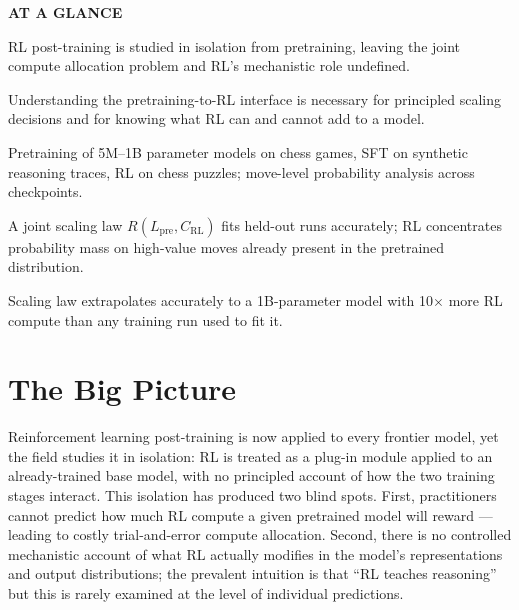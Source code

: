 \documentclass[10pt,twocolumn]{article}
\begin{document}
\begin{mdframed}[backgroundcolor=boxgray,linecolor=rulered,linewidth=1pt,
    innerleftmargin=6pt,innerrightmargin=6pt,
    innertopmargin=6pt,innerbottommargin=6pt]
\textbf{\small AT A GLANCE}\par\vspace{4pt}
\begin{description}[leftmargin=0pt,labelsep=4pt,itemsep=2pt,parsep=0pt,
    font=\small\bfseries]
  \item[Problem:] RL post-training is studied in isolation from pretraining,
    leaving the joint compute allocation problem and RL's mechanistic
    role undefined.
  \item[Why it matters:] Understanding the pretraining-to-RL interface
    is necessary for principled scaling decisions and for knowing what
    RL can and cannot add to a model.
  \item[Method:] Pretraining of 5M--1B parameter models on chess games,
    SFT on synthetic reasoning traces, RL on chess puzzles; move-level
    probability analysis across checkpoints.
  \item[Result:] A joint scaling law $R(L_{\text{pre}}, C_{\text{RL}})$
    fits held-out runs accurately; RL concentrates probability mass on
    high-value moves already present in the pretrained distribution.
  \item[Evidence:] Scaling law extrapolates accurately to a 1B-parameter
    model with 10$\times$ more RL compute than any training run used
    to fit it.
\end{description}
\end{mdframed}

\section{The Big Picture}

Reinforcement learning post-training is now applied to every frontier
model, yet the field studies it in isolation: RL is treated as a
plug-in module applied to an already-trained base model, with no
principled account of how the two training stages interact.
This isolation has produced two blind spots.
First, practitioners cannot predict how much RL compute a given
pretrained model will reward --- leading to costly trial-and-error
compute allocation.
Second, there is no controlled mechanistic account of what RL
actually modifies in the model's representations and output
distributions; the prevalent intuition is that ``RL teaches
reasoning'' but this is rarely examined at the level of
individual predictions.
\end{document}
